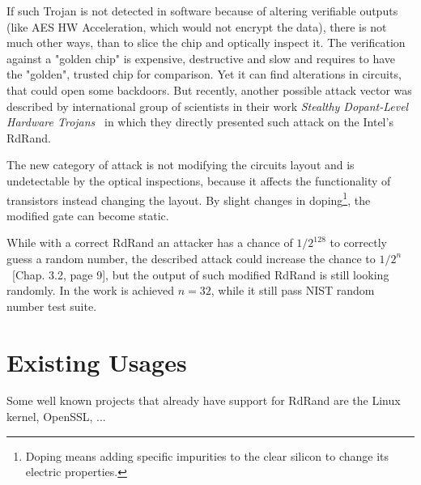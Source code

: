 \par{
If such Trojan is not detected in software because of altering verifiable outputs 
(like AES HW Acceleration, which would not encrypt the data), 
there is not much other ways, than to slice the chip and optically inspect it. 
The verification against a "golden chip" is expensive, destructive and slow 
and requires to have the "golden", trusted chip for comparison.
Yet it can find alterations in circuits, that could open some backdoors. 
But recently, another possible attack vector was described by international group
 of scientists in their work {\em Stealthy Dopant-Level Hardware Trojans}~\cite{DopantAttack} 
 in which they directly presented such attack on the Intel's RdRand.
}

\par{
The new category of attack is not modifying the circuits layout 
and is undetectable by the optical inspections, because it affects the functionality
 of transistors instead changing the layout. By slight changes 
 in doping\footnote{Doping means adding specific impurities to the clear silicon 
 to change its electric properties.}, the modified gate can become static.
}

\par{
While with a correct RdRand an attacker has a chance of $ 1/2^{128}$ to correctly guess 
a random number, the described attack could increase the chance to 
$ 1/2^n$~\cite{DopantAttack}[Chap. 3.2, page 9], but the output of such
 modified RdRand is still looking randomly. In the work is achieved  
 $n = 32$, while it still pass NIST random number test suite.
}
\section{Existing Usages} 
\par{
Some well known projects that already have support for RdRand are the Linux kernel, OpenSSL, ...
}

